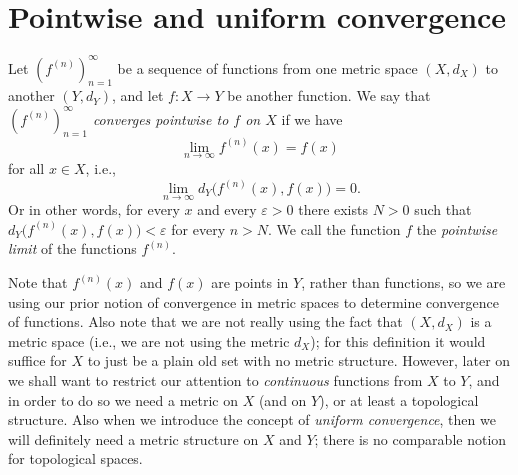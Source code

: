 \section{Pointwise and uniform convergence}\label{sec 3.2}

\begin{definition}\label{3.2.1}
    Let \((f^{(n)})_{n = 1}^\infty\) be a sequence of functions from one metric space \((X, d_X)\) to another \((Y, d_Y)\), and let \(f : X \to Y\) be another function.
    We say that \emph{\((f^{(n)})_{n = 1}^\infty\) converges pointwise to \(f\) on \(X\)} if we have
    \[
        \lim_{n \to \infty} f^{(n)}(x) = f(x)
    \]
    for all \(x \in X\), i.e.,
    \[
        \lim_{n \to \infty} d_Y\big(f^{(n)}(x), f(x)\big) = 0.
    \]
    Or in other words, for every \(x\) and every \(\varepsilon > 0\) there exists \(N > 0\) such that \(d_Y\big(f^{(n)}(x), f(x)\big) < \varepsilon\) for every \(n > N\).
    We call the function \(f\) the \emph{pointwise limit} of the functions \(f^{(n)}\).
\end{definition}

\begin{remark}\label{3.2.2}
    Note that \(f^{(n)}(x)\) and \(f(x)\) are points in \(Y\), rather than functions, so we are using our prior notion of convergence in metric spaces to determine convergence of functions.
    Also note that we are not really using the fact that \((X, d_X)\) is a metric space
    (i.e., we are not using the metric \(d_X\));
    for this definition it would suffice for \(X\) to just be a plain old set with no metric structure.
    However, later on we shall want to restrict our attention to \emph{continuous} functions from \(X\) to \(Y\), and in order to do so we need a metric on \(X\) (and on \(Y\)), or at least a topological structure.
    Also when we introduce the concept of \emph{uniform convergence}, then we will definitely need a metric structure on \(X\) and \(Y\);
    there is no comparable notion for topological spaces.
\end{remark}